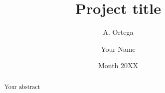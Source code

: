 \documentclass[thesis]{mas_report}
\author{A. Ortega}
\author{Your Name}
\title{Project title}
\date{Month 20XX}
\begin{document}
\begin{titlepage}
    \maketitle
\end{titlepage}




% 




\begin{abstract}
Your abstract
\end{abstract}



\tableofcontents
\listoffigures
\listoftables




\mainmatter %














\begin{appendices}


\end{appendices}

\backmatter

% 
%
\end{document}
